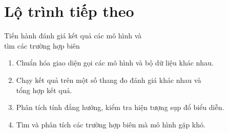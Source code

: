 \documentclass[aspectratio=169,10pt]{beamer}
\newcommand{\AuthorName}{Đỗ Thành Trung}
\newcommand{\UniversityName}{IAI, UET - VNU}
\newcommand{\DeckTitle}{Đánh giá các mô hình nhúng \\ cho tiếng Việt}
\begin{document}
\section{Lộ trình tiếp theo}
\begin{frame}{Tiến hành đánh giá kết quả các mô hình và \\ tìm các trường hợp biên}
    \begin{enumerate}
        \item Chuẩn hóa giao diện gọi các mô hình và bộ dữ liệu khác nhau.
        \item Chạy kết quả trên một số thang đo đánh giá khác nhau và \\ tổng hợp kết quả.
        \item Phân tích tính đẳng hướng, kiểm tra hiện tượng sụp đổ biểu diễn.
        \item Tìm và phân tích các trường hợp biên mà mô hình gặp khó.
    \end{enumerate}
\end{frame}

\end{document}
